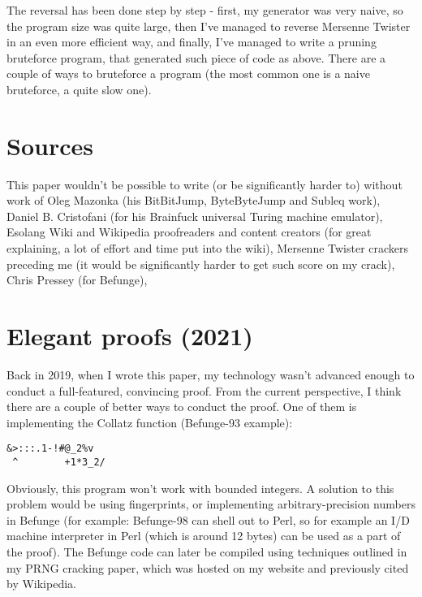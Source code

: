 \documentclass{article}
\begin{document}
\par The reversal has been done step by step - first, my generator was very naive, so the program size was quite large, then I've managed to reverse Mersenne Twister in an even more efficient way, and finally, I've managed to write a pruning bruteforce program, that generated such piece of code as above. There are a couple of ways to bruteforce a program (the most common one is a naive bruteforce, a quite slow one).

\section{Sources}

\par This paper wouldn't be possible to write (or be significantly harder to) without work of Oleg Mazonka (his BitBitJump, ByteByteJump and Subleq work), Daniel B. Cristofani (for his Brainfuck universal Turing machine emulator), Esolang Wiki and Wikipedia proofreaders and content creators (for great explaining, a lot of effort and time put into the wiki), Mersenne Twister crackers preceding me (it would be significantly harder to get such score on my crack), Chris Pressey (for Befunge), 

\section{Elegant proofs (2021)}

\par Back in 2019, when I wrote this paper, my technology wasn't advanced enough to conduct a full-featured, convincing proof. From the current perspective, I think there are a couple of better ways to conduct the proof. One of them is implementing the Collatz function (Befunge-93 example):

\begin{verbatim}
&>:::.1-!#@_2%v
 ^        +1*3_2/
\end{verbatim}

\par Obviously, this program won't work with bounded integers. A solution to this problem would be using fingerprints, or implementing arbitrary-precision numbers in Befunge (for example: Befunge-98 can shell out to Perl, so for example an I/D machine interpreter in Perl (which is around 12 bytes) can be used as a part of the proof). The Befunge code can later be compiled using techniques outlined in my PRNG cracking paper, which was hosted on my website and previously cited by Wikipedia.
\end{document}
